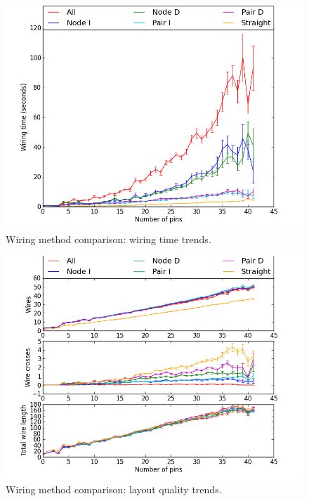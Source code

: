 \begin{figure}[H]
\begin{center}
\includegraphics[width=\textwidth]{Images/wiring_time_trend_comparison.png}
\caption{Wiring method comparison: wiring time trends.}
\label{fig:wiring_time_trend}
\end{center}
\end{figure}

\begin{figure}[H]
\begin{center}
\includegraphics[width=\textwidth]{Images/wiring_quality_trend_comparison.png}
\caption{Wiring method comparison: layout quality trends.}
\label{fig:wiring_quality_trend}
\end{center}
\end{figure}

